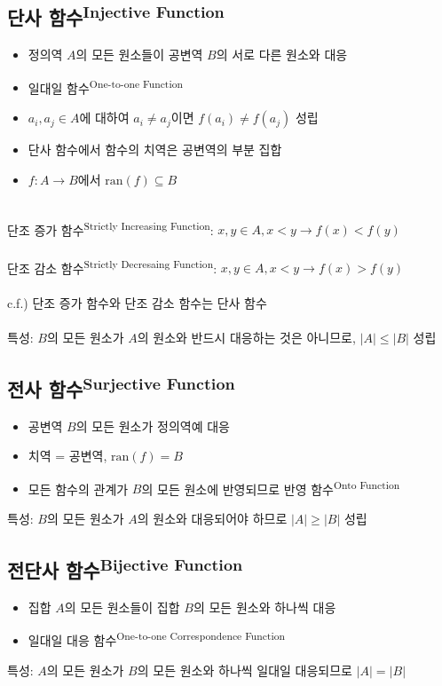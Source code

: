 \subsection{단사 함수\textsuperscript{Injective Function}}
\begin{itemize}
    \item 정의역 $A$의 모든 원소들이 공변역 $B$의 서로 다른 원소와 대응
    \item 일대일 함수\textsuperscript{One-to-one Function}
    \item $a_i, a_j \in A$에 대하여 $a_i \neq a_j$이면 $f(a_i) \neq f(a_j)$ 성립
    \item 단사 함수에서 함수의 치역은 공변역의 부분 집합
    \item $f:A \to B$에서 $\mathrm{ran}(f) \subseteq B$
\end{itemize}\phantom{}\\
단조 증가 함수\textsuperscript{Strictly Increasing Function}:
$x, y \in A, x < y \to f(x) < f(y)$\\\\
단조 감소 함수\textsuperscript{Strictly Decresaing Function}:
$x, y \in A, x < y \to f(x) > f(y)$\\\\
c.f.) 단조 증가 함수와 단조 감소 함수는 단사 함수
\\\\
특성: $B$의 모든 원소가 $A$의 원소와 반드시 대응하는 것은 아니므로, $|A| \leq |B|$ 성립

\newpage
\subsection{전사 함수\textsuperscript{Surjective Function}}
\begin{itemize}
    \item 공변역 $B$의 모든 원소가 정의역예 대응
    \item 치역 = 공변역, $\mathrm{ran}(f) = B$
    \item 모든 함수의 관계가 $B$의 모든 원소에 반영되므로 반영 함수\textsuperscript{Onto Function}
\end{itemize}
특성: $B$의 모든 원소가 $A$의 원소와 대응되어야 하므로 $|A| \geq |B|$ 성립

\subsection{전단사 함수\textsuperscript{Bijective Function}}
\begin{itemize}
    \item 집합 $A$의 모든 원소들이 집합 $B$의 모든 원소와 하나씩 대응
    \item 일대일 대응 함수\textsuperscript{One-to-one Correspondence Function}
\end{itemize}
특성: $A$의 모든 원소가 $B$의 모든 원소와 하나씩 일대일 대응되므로 $|A| = |B|$

